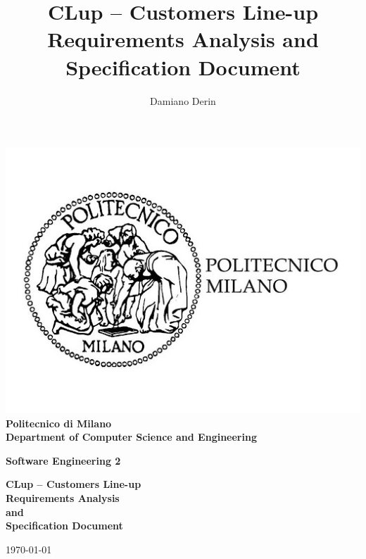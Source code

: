 \title{CLup – Customers Line-up \\ Requirements Analysis and Specification Document}
\author{Damiano Derin}

\begin{titlepage}
    \begin{center}
    \BgThispage
    \includegraphics[scale=0.3]{images/polimi_logo.jpg}\\
    {\LARGE {\bfseries Politecnico di Milano \\}}
    \vspace{.5cm}
    {\Large {\bfseries Department of Computer Science and Engineering \\}}
    \vspace{1.0cm}
    
    {\Large {\bfseries Software Engineering 2 \\}}
    \vspace{2.0cm}
    
    
    {\LARGE {\bfseries CLup – Customers Line-up \\
    	Requirements Analysis \\ and \\ Specification Document\\}}
    \vspace{1cm}

    {\large \today \\
    }



\end{center}
\end{titlepage}
